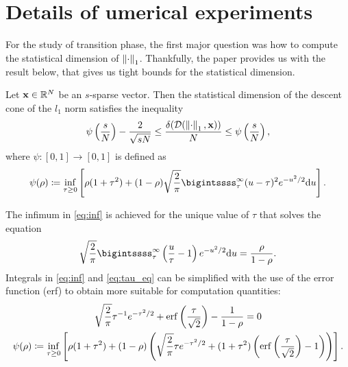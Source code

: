 \section{Details of umerical experiments}

For the study of transition phase, the first major question was how to compute the statistical dimension of $\left\Vert\cdot\right\Vert_1$.
Thankfully, the paper \cite{livingontheedge} provides us with the result below, that gives us tight bounds for the statistical dimension.

\begin{proposition}
    Let $\mathbf{x} \in \mathbb{R}^N$ be an $s$-sparse vector.
    Then the statistical dimension of the descent cone of the $l_1$ norm satisfies the inequality
    \begin{equation}
        \psi\left( \frac{s}{N} \right) - \frac{2}{\sqrt{sN}} \leq \frac{\delta(\mathcal{D}(\left\Vert\cdot\right\Vert_1, \mathbf{x}))}{N}
        \leq \psi\left( \frac{s}{N} \right),
    \end{equation}
    where $\psi:[0,1] \rightarrow [0, 1]$ is defined as
    \begin{equation} \label{eq:inf}
        \psi(\rho) \coloneq \inf_{\tau \geq 0} \left[ \rho (1+\tau^2) +
        (1-\rho) \sqrt{\frac{2}{\pi}} \bigintssss_\tau^\infty  (u-\tau)^2  e^{-u^2/2}\mathrm{d}u \right].
    \end{equation}
\end{proposition}

The infimum in \ref{eq:inf} is achieved for the unique value of $\tau$ that solves the equation
\begin{equation} \label{eq:tau_eq}
    \sqrt{\frac{2}{\pi}}\bigintssss_{\tau}^{\infty} \left( \frac{u}{\tau} - 1 \right) e^{-u^2/2} \mathrm{d} u = \frac{\rho}{1 - \rho}.
\end{equation}
Integrals in \ref{eq:inf} and \ref{eq:tau_eq} can be simplified with the use of the error function (erf) to obtain more suitable
for computation quantities:
    \begin{gather}
        \sqrt{\frac{2}{\pi}}\tau^{-1}e^{-\tau^2/2} + \operatorname{erf}\left( \frac{\tau}{\sqrt{2}} \right) - \frac{1}{1-\rho} = 0
        \\
        \psi(\rho) \coloneq \inf_{\tau \geq 0} \left[ \rho (1+\tau^2) +
        (1-\rho) \left( \sqrt{\frac{2}{\pi}} \tau e^{-\tau^2/2} + (1+\tau^2)\left(\mathrm{erf}\left(\frac{\tau}{\sqrt{2}}\right) - 1\right) \right) \right].
    \end{gather}

